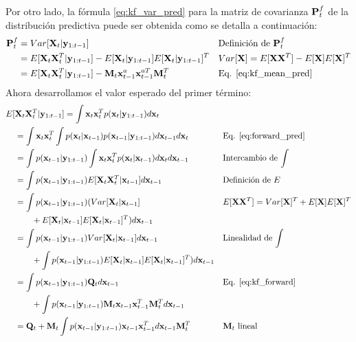 Por otro lado, la fórmula \ref{eq:kf_var_pred} para la matriz de covarianza $\mathbf{P}_t^f$ de la distribución predictiva puede ser obtenida como se detalla a continuación:
\begin{align*}
    \mathbf{P}_t^f &= Var[\mathbf{X}_t | \mathbf{y}_{1:t-1}] && \text{Definición de $\mathbf{P}_t^f$}\\ 
    &= E[\mathbf{X}_t \mathbf{X}_t^T | \mathbf{y}_{1:t-1}] - E[\mathbf{X}_t | \mathbf{y}_{1:t-1}] E[\mathbf{X}_t | \mathbf{y}_{1:t-1}]^T && \text{$Var[\mathbf{X}] = E[\mathbf{X} \mathbf{X}^T] - E[\mathbf{X}]E[\mathbf{X}]^T$} \\
    &= E[\mathbf{X}_t \mathbf{X}_t^T | \mathbf{y}_{1:t-1}] - \mathbf{M}_t \mathbf{x}_{t-1}^a \mathbf{x}_{t-1}^{aT} \mathbf{M}_t^T && \text{Eq. \ref{eq:kf_mean_pred}}
\end{align*}
Ahora desarrollamos el valor esperado del primer término:
\begin{align*}
    E[&\v X_t \v X_t^T | \v y_{1:t-1}] = \int \v x_t \v x_t^T p(\v x_t | \v y_{1:t-1}) d\v x_t && \\
     &= \int \v x_t \v x_t^T \int p(\v x_t | \v x_{t-1}) p(\v x_{t-1} | \v y_{1:t-1}) d\v x_{t-1} d\v x_t && \text{Eq. \ref{eq:forward_pred}}\\
    &= \int p(\v x_{t-1} | \v y_{1:t-1}) \int \v x_t \v x_t^T p(\v x_t | \v x_{t-1}) d\v x_t d\v x_{t-1} && \text{Intercambio de $\int$}\\
    &= \int p(\v x_{t-1} | \v y_{1:t-1}) E[\v X_t \v X_t^T | \v x_{t-1}] d\v x_{t-1} && \text{Definición de $E$}\\
    &= \int p(\v x_{t-1} | \v y_{1:t-1}) (Var[\v X_t | \v x_{t-1}] && \text{$E[\v X \v X^T] = Var[\v X]^T + E[\v X]E[\v X]^T$}\\
    &\hspace{2em} + E[\v X_t | \v x_{t-1}]E[\v X_t | \v x_{t-1}]^T) d\v x_{t-1} && \\
    &= \int p(\v x_{t-1} | \v y_{1:t-1}) Var[\v X_t | \v x_{t-1}] d \v x_{t-1} && \text{Linealidad de $\int$}\\
    &\hspace{2em} + \int p(\v x_{t-1} | \v y_{1:t-1}) E[\v X_t | \v x_{t-1}]E[\v X_t | \v x_{t-1}]^T) d\v x_{t-1} && \\
    &= \int p(\v x_{t-1} | \v y_{1:t-1}) \v Q_t d \v x_{t-1} && \text{Eq. \ref{eq:kf_forward}}\\
    &\hspace{2em} + \int p(\v x_{t-1} | \v y_{1:t-1}) \v M_t \v x_{t-1} \v x_{t-1}^T \v M_t^T d\v x_{t-1} \\
    &= \v Q_t + \v M_t \int p(\v x_{t-1} | \v y_{1:t-1}) \v x_{t-1} \v x_{t-1}^T d\v x_{t-1} \v M_t^T && \text{$\v M_t$ lineal}\\

\end{align*}
